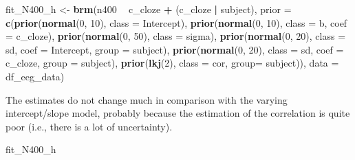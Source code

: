 \documentclass[12pt,]{krantz}
\newenvironment{Shaded}{\begin{snugshade}}{\end{snugshade}}
\newcommand{\DataTypeTok}[1]{\textcolor[rgb]{0.13,0.29,0.53}{#1}}
\newcommand{\DecValTok}[1]{\textcolor[rgb]{0.00,0.00,0.81}{#1}}
\newcommand{\KeywordTok}[1]{\textcolor[rgb]{0.13,0.29,0.53}{\textbf{#1}}}
\newcommand{\NormalTok}[1]{#1}
\newcommand{\OperatorTok}[1]{\textcolor[rgb]{0.81,0.36,0.00}{\textbf{#1}}}
\newcommand{\StringTok}[1]{\textcolor[rgb]{0.31,0.60,0.02}{#1}}
\theoremstyle{definition}
\theoremstyle{definition}
\theoremstyle{definition}
\theoremstyle{remark}
\begin{document}
\begin{Shaded}
\begin{Highlighting}[]
\NormalTok{fit_N400_h <-}\StringTok{ }\KeywordTok{brm}\NormalTok{(n400 }\OperatorTok{~}\StringTok{ }\NormalTok{c_cloze }\OperatorTok{+}\StringTok{ }\NormalTok{(c_cloze }\OperatorTok{|}\StringTok{ }\NormalTok{subject),}
                  \DataTypeTok{prior =}
                      \KeywordTok{c}\NormalTok{(}\KeywordTok{prior}\NormalTok{(}\KeywordTok{normal}\NormalTok{(}\DecValTok{0}\NormalTok{, }\DecValTok{10}\NormalTok{), }\DataTypeTok{class =}\NormalTok{ Intercept),}
                        \KeywordTok{prior}\NormalTok{(}\KeywordTok{normal}\NormalTok{(}\DecValTok{0}\NormalTok{, }\DecValTok{10}\NormalTok{), }\DataTypeTok{class =}\NormalTok{ b, }\DataTypeTok{coef =}\NormalTok{ c_cloze),}
                        \KeywordTok{prior}\NormalTok{(}\KeywordTok{normal}\NormalTok{(}\DecValTok{0}\NormalTok{, }\DecValTok{50}\NormalTok{), }\DataTypeTok{class =}\NormalTok{ sigma),}
                        \KeywordTok{prior}\NormalTok{(}\KeywordTok{normal}\NormalTok{(}\DecValTok{0}\NormalTok{, }\DecValTok{20}\NormalTok{), }\DataTypeTok{class =}\NormalTok{ sd, }\DataTypeTok{coef =}\NormalTok{ Intercept, }\DataTypeTok{group =}\NormalTok{ subject),}
                        \KeywordTok{prior}\NormalTok{(}\KeywordTok{normal}\NormalTok{(}\DecValTok{0}\NormalTok{, }\DecValTok{20}\NormalTok{), }\DataTypeTok{class =}\NormalTok{ sd, }\DataTypeTok{coef =}\NormalTok{ c_cloze, }\DataTypeTok{group =}\NormalTok{ subject),}
                        \KeywordTok{prior}\NormalTok{(}\KeywordTok{lkj}\NormalTok{(}\DecValTok{2}\NormalTok{), }\DataTypeTok{class =}\NormalTok{ cor, }\DataTypeTok{group=}\NormalTok{ subject)),}
              \DataTypeTok{data =}\NormalTok{ df_eeg_data)}
\end{Highlighting}
\end{Shaded}

The estimates do not change much in comparison with the varying intercept/slope model, probably because the estimation of the correlation is quite poor (i.e., there is a lot of uncertainty).

\begin{Shaded}
\begin{Highlighting}[]
\NormalTok{fit_N400_h}
\end{Highlighting}
\end{Shaded}
\end{document}
